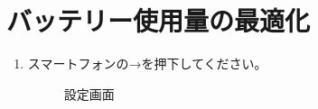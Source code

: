 \section{バッテリー使用量の最適化}
\label{sec:battery1}
    \begin{enumerate}
        \item スマートフォンの→を押下してください。
            \begin{figure}[htbp]
                \centering
                \caption{設定画面}
                \label{img:battery1}
            \end{figure}


\end{enumerate}
